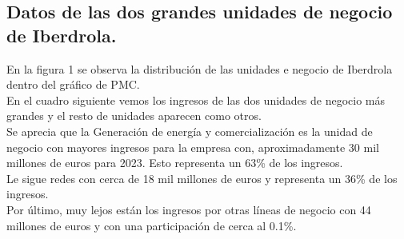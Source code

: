 \documentclass{article}
\begin{document}
\subsection{Datos de las dos grandes unidades de negocio de Iberdrola.}

En la figura 1 se observa la distribución de las unidades e negocio de Iberdrola dentro del gráfico de PMC. 
\\

En el cuadro siguiente vemos los ingresos de las dos unidades de negocio más grandes y el resto de unidades aparecen como otros. 
\\

Se aprecia que la Generación de energía y comercialización es la unidad de negocio con mayores ingresos para la empresa con, aproximadamente 30 mil millones de euros para 2023. Esto representa un 63\% de los ingresos. 
\\
Le sigue redes con cerca de 18 mil millones de euros y representa un 36\% de los ingresos.
\\
Por último, muy lejos están los ingresos por otras líneas de negocio con 44 millones de euros y con una participación de cerca al 0.1\%. 

\begin{table}[h!]
    \centering
    \caption{Ingresos de Iberdrola por unidad de negocio en millones de euros y participación porcentual. Fuente: Iberdrola. Elaboración propia.}
    \label{tab:ingresos_iberdrola}
\end{table}
\end{document}
